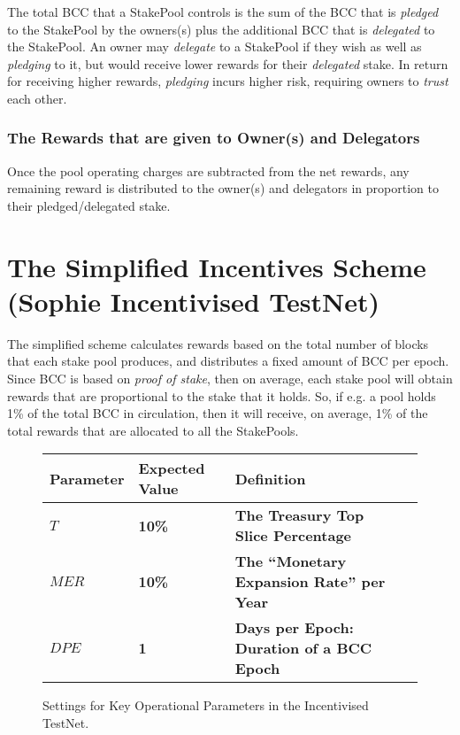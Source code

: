\documentclass[11pt,a4paper,dvipsnames,twosided,final]{article}
\newcommand{\bcc}{BCC{}}
\newcommand{\bcc}[1]{Bcc}
\begin{document}
\noindent
The total \bcc{} that a StakePool controls is the sum of the \bcc{} that is \emph{pledged} to the StakePool by the owners(s) plus
the additional \bcc{} that is \emph{delegated} to the StakePool.  An owner may \emph{delegate} to a StakePool if
they wish as well as \emph{pledging} to it, but would receive lower rewards for their \emph{delegated} stake.
In return for receiving higher rewards, \emph{pledging} incurs higher risk, requiring owners to \emph{trust} each other.


\subsubsection*{The Rewards that are given to Owner(s) and Delegators}

Once the pool operating charges are subtracted from the net rewards, any remaining reward is distributed to the owner(s) and delegators
in proportion to their pledged/delegated stake.  %


\clearpage
\section{The Simplified Incentives Scheme (Sophie Incentivised TestNet)}
\label{sec:TestNet}

The simplified scheme calculates rewards based on the total number of blocks that each stake pool produces,
and distributes a fixed amount of \bcc{} per epoch.
Since \bcc{} is based on \emph{proof of stake}, then on average, each stake pool will obtain
rewards that are proportional to the stake that it holds.  So, if e.g. a pool holds 1\% of the total
\bcc{} in circulation, then it will receive, on average, 1\% of the total rewards that are allocated to all the
StakePools.

\begin{figure}[h!]
\begin{center}
\begin{tabular}{||l|l|p{10cm}|l||}
  \hline \hline
\textbf{Parameter} & \textbf{Expected Value} & \textbf{Definition} \\\hline
\textbf{\color{green} $T$} & \textbf{\color{green} 10\%} & \textbf{\color{green} The Treasury Top Slice Percentage} \\\hline
\textbf{\color{green} $\textit{MER}$} & \textbf{\color{green} 10\%}&  \textbf{\color{green} The ``Monetary Expansion Rate'' per Year}\\\hline
\textbf{\color{green} $\textit{DPE}$} & \textbf{\color{green} 1} & \textbf{\color{green}  Days per Epoch: Duration of a \bcc{} Epoch} \\\hline
  \hline
\end{tabular}
\end{center}
\caption{Settings for Key Operational Parameters in the Incentivised TestNet.}
\end{figure}
\end{document}
